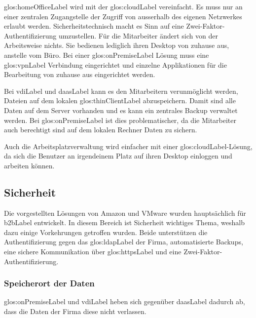 \gls{glos:homeOfficeLabel} wird mit der \Gls{glos:cloudLabel} vereinfacht. Es muss nur an einer zentralen Zugangstelle der Zugriff von ausserhalb des eigenen Netzwerkes erlaubt werden. Sicherheitstechnisch macht es Sinn auf eine Zwei-Faktor-Authentifizierung umzustellen. Für die Mitarbeiter ändert sich von der Arbeitsweise nichts. Sie bedienen lediglich ihren Desktop von zuhause aus, anstelle vom Büro. Bei einer \gls{glos:onPremiseLabel} Lösung muss eine \gls{glos:vpnLabel} Verbindung eingerichtet und einzelne Applikationen für die Bearbeitung von zuhause aus eingerichtet werden.

Bei \Gls{vdiLabel} und \Gls{daasLabel} kann es den Mitarbeitern verunmöglicht werden, Dateien auf dem lokalen \gls{glos:thinClientLabel} abzuspeichern. Damit sind alle Daten auf dem Server vorhanden und es kann ein zentrales Backup verwaltet werden. Bei \gls{glos:onPremiseLabel} ist dies problematischer, da die Mitarbeiter auch berechtigt sind auf dem lokalen Rechner Daten zu sichern.

Auch die Arbeitsplatzverwaltung wird einfacher mit einer \Gls{glos:cloudLabel}-Lösung, da sich die Benutzer an irgendeinem Platz auf ihren Desktop einloggen und arbeiten können.

\subsection{Sicherheit}
Die vorgestellten Lösungen von Amazon und VMware wurden hauptsächlich für \Gls{b2bLabel} entwickelt. In diesem Bereich ist Sicherheit wichtiges Thema, weshalb dazu einige Vorkehrungen getroffen wurden. Beide unterstützen die Authentifizierung gegen das \gls{glos:ldapLabel} der Firma, automatisierte Backups, eine sichere Kommunikation über \gls{glos:httpsLabel} und eine Zwei-Faktor-Authentifizierung.

\subsubsection{Speicherort der Daten}
\Gls{glos:onPremiseLabel} und \Gls{vdiLabel} heben sich gegenüber \Gls{daasLabel} dadurch ab, dass die Daten der Firma diese nicht verlassen.

